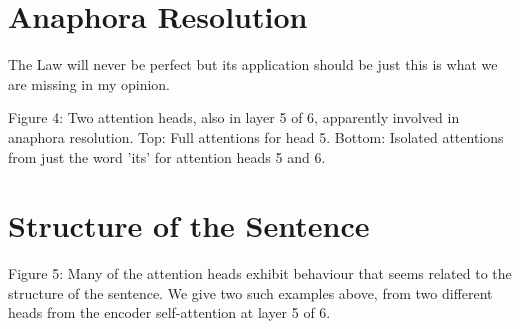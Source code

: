 \documentclass[conference]{IEEEtran}
\begin{document}
\section{Anaphora Resolution}
The Law will never be perfect but its application should be just this is what we are missing in my opinion.

Figure 4: Two attention heads, also in layer 5 of 6, apparently involved in anaphora resolution. Top: Full attentions for head 5. Bottom: Isolated attentions from just the word 'its' for attention heads 5 and 6.

\section{Structure of the Sentence}
Figure 5: Many of the attention heads exhibit behaviour that seems related to the structure of the sentence. We give two such examples above, from two different heads from the encoder self-attention at layer 5 of 6.
\end{document}

